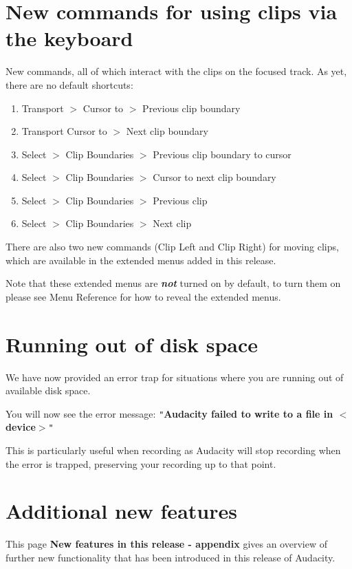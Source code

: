 \section{New commands for using clips via the keyboard}


New commands, all of which interact with the clips on the focused track. As yet, there are no default shortcuts:
\begin{enumerate}
\item Transport \mbox{$>$} Cursor to \mbox{$>$} Previous clip boundary
\item Transport Cursor to \mbox{$>$} Next clip boundary
\item Select \mbox{$>$} Clip Boundaries \mbox{$>$} Previous clip boundary to cursor 
\item Select \mbox{$>$} Clip Boundaries \mbox{$>$} Cursor to next clip boundary 
\item Select \mbox{$>$} Clip Boundaries \mbox{$>$} Previous clip 
\item Select \mbox{$>$} Clip Boundaries \mbox{$>$} Next clip 
\end{enumerate}
There are also two new commands (Clip Left and Clip Right) for moving clips, which are available in the extended menus added in this release.

Note that these extended menus are \textit{\textbf{not}} turned on by default, to turn them on please see Menu Reference for how to reveal the extended menus.


\section{Running out of disk space}


We have now provided an error trap for situations where you are running out of available disk space.

You will now see the error message:
\texttt{{}"{}}\textbf{Audacity failed to write to a file in \mbox{$<$}device\mbox{$>$}}\texttt{{}"{}}

This is particularly useful when recording as Audacity will stop recording when the error is trapped, preserving your recording up to that point.


\section{Additional new features}


This page \textbf{New features in this release - appendix} gives an overview of further new functionality that has been introduced in this release of Audacity.


